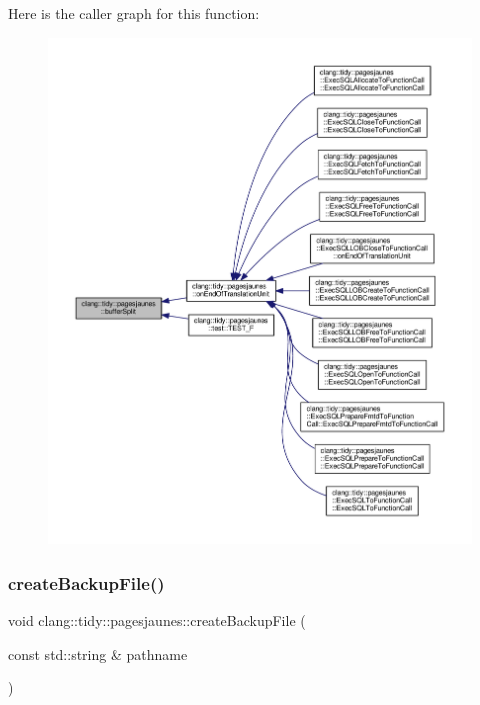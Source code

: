 Here is the caller graph for this function\+:
\nopagebreak
\begin{figure}[H]
\begin{center}
\leavevmode
\includegraphics[width=350pt]{namespaceclang_1_1tidy_1_1pagesjaunes_aba7a8f3d6ead090299ad745421c3f77e_icgraph}
\end{center}
\end{figure}
\mbox{\label{namespaceclang_1_1tidy_1_1pagesjaunes_a2ab2e0d5d7deb5eea7106a4c7a8c3e10}} 
\subsubsection{\texorpdfstring{create\+Backup\+File()}{createBackupFile()}}
{\footnotesize\ttfamily void clang\+::tidy\+::pagesjaunes\+::create\+Backup\+File (\begin{DoxyParamCaption}\item[{const std\+::string \&}]{pathname }\end{DoxyParamCaption})}



